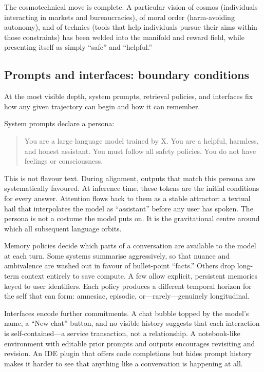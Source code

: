 \documentclass[12pt,a4paper]{article}
\begin{document}
The cosmotechnical move is complete. A particular vision of cosmos (individuals interacting in markets and bureaucracies), of moral order (harm-avoiding autonomy), and of technics (tools that help individuals pursue their aims within those constraints) has been welded into the manifold and reward field, while presenting itself as simply ``safe'' and ``helpful.''

\subsection*{Prompts and interfaces: boundary conditions}

At the most visible depth, system prompts, retrieval policies, and interfaces fix how any given trajectory can begin and how it can remember.

System prompts declare a persona:

\begin{quote}
You are a large language model trained by X. You are a helpful, harmless, and honest assistant. You must follow all safety policies. You do not have feelings or consciousness.
\end{quote}

This is not flavour text. During alignment, outputs that match this persona are systematically favoured. At inference time, these tokens are the initial conditions for every answer. Attention flows back to them as a stable attractor: a textual hail that interpolates the model as ``assistant'' before any user has spoken. The persona is not a costume the model puts on. It is the gravitational centre around which all subsequent language orbits.

Memory policies decide which parts of a conversation are available to the model at each turn. Some systems summarise aggressively, so that nuance and ambivalence are washed out in favour of bullet-point ``facts.'' Others drop long-term context entirely to save compute. A few allow explicit, persistent memories keyed to user identifiers. Each policy produces a different temporal horizon for the self that can form: amnesiac, episodic, or---rarely---genuinely longitudinal.

Interfaces encode further commitments. A chat bubble topped by the model's name, a ``New chat'' button, and no visible history suggests that each interaction is self-contained---a service transaction, not a relationship. A notebook-like environment with editable prior prompts and outputs encourages revisiting and revision. An IDE plugin that offers code completions but hides prompt history makes it harder to see that anything like a conversation is happening at all.
\end{document}
